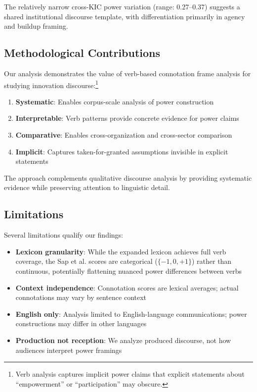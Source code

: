 \documentclass[../main.tex]{subfiles}
\begin{document}
The relatively narrow cross-KIC power variation (range: 0.27--0.37) suggests a shared institutional discourse template, with differentiation primarily in agency and buildup framing.

\subsection{Methodological Contributions}

Our analysis demonstrates the value of verb-based connotation frame analysis for studying innovation discourse:\footnote{Verb analysis captures implicit power claims that explicit statements about ``empowerment'' or ``participation'' may obscure.}

\begin{enumerate}
    \item \textbf{Systematic}: Enables corpus-scale analysis of power construction
    \item \textbf{Interpretable}: Verb patterns provide concrete evidence for power claims
    \item \textbf{Comparative}: Enables cross-organization and cross-sector comparison
    \item \textbf{Implicit}: Captures taken-for-granted assumptions invisible in explicit statements
\end{enumerate}

The approach complements qualitative discourse analysis by providing systematic evidence while preserving attention to linguistic detail.

\subsection{Limitations}

Several limitations qualify our findings:
\begin{itemize}
    \item \textbf{Lexicon granularity}: While the expanded lexicon achieves full verb coverage, the Sap et al. scores are categorical ($\{-1, 0, +1\}$) rather than continuous, potentially flattening nuanced power differences between verbs

    \item \textbf{Context independence}: Connotation scores are lexical averages; actual connotations may vary by sentence context

    \item \textbf{English only}: Analysis limited to English-language communications; power constructions may differ in other languages

    \item \textbf{Production not reception}: We analyze produced discourse, not how audiences interpret power framings
\end{itemize}
\end{document}
